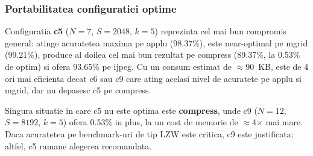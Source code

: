 \subsubsection*{Portabilitatea configuratiei optime}

Configuratia \textbf{c5} ($N=7$, $S=2048$, $k=5$) reprezinta cel mai bun
compromis general: atinge acuratetea maxima pe applu (98.37\%), este near-optimal
pe mgrid (99.21\%), produce al doilea cel mai bun rezultat pe compress (89.37\%,
la 0.53\% de optim) si ofera 93.65\% pe ijpeg. Cu un consum estimat de
$\approx$90~KB, este de 4 ori mai eficienta decat c6 sau c9 care ating acelasi
nivel de acuratete pe applu si mgrid, dar nu depasesc c5 pe compress.

Singura situatie in care c5 nu este optima este \textbf{compress}, unde c9
($N=12$, $S=8192$, $k=5$) ofera 0.53\% in plus, la un cost de memorie de
$\approx$4$\times$ mai mare. Daca acuratetea pe benchmark-uri de tip LZW este
critica, c9 este justificata; altfel, c5 ramane alegerea recomandata.
